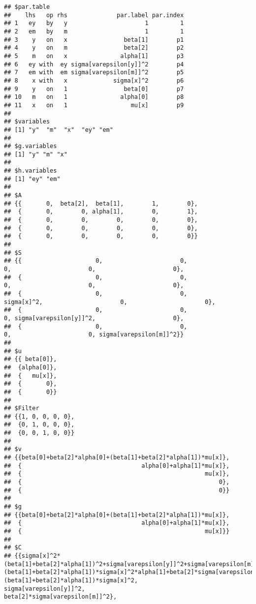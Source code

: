 \documentclass[
]{book}
\theoremstyle{definition}
\theoremstyle{definition}
\theoremstyle{definition}
\theoremstyle{remark}
\begin{document}
\begin{verbatim}
## $par.table
##    lhs   op rhs              par.label par.index
## 1   ey   by   y                      1         1
## 2   em   by   m                      1         1
## 3    y   on   x                beta[1]        p1
## 4    y   on   m                beta[2]        p2
## 5    m   on   x               alpha[1]        p3
## 6   ey with  ey sigma[varepsilon[y]]^2        p4
## 7   em with  em sigma[varepsilon[m]]^2        p5
## 8    x with   x             sigma[x]^2        p6
## 9    y   on   1                beta[0]        p7
## 10   m   on   1               alpha[0]        p8
## 11   x   on   1                  mu[x]        p9
## 
## $variables
## [1] "y"  "m"  "x"  "ey" "em"
## 
## $g.variables
## [1] "y" "m" "x"
## 
## $h.variables
## [1] "ey" "em"
## 
## $A
## {{       0,  beta[2],  beta[1],        1,        0},
##  {       0,        0, alpha[1],        0,        1},
##  {       0,        0,        0,        0,        0},
##  {       0,        0,        0,        0,        0},
##  {       0,        0,        0,        0,        0}} 
## 
## $S
## {{                     0,                      0,                      0,                      0,                      0},
##  {                     0,                      0,                      0,                      0,                      0},
##  {                     0,                      0,             sigma[x]^2,                      0,                      0},
##  {                     0,                      0,                      0, sigma[varepsilon[y]]^2,                      0},
##  {                     0,                      0,                      0,                      0, sigma[varepsilon[m]]^2}} 
## 
## $u
## {{ beta[0]},
##  {alpha[0]},
##  {   mu[x]},
##  {       0},
##  {       0}} 
## 
## $Filter
## {{1, 0, 0, 0, 0},
##  {0, 1, 0, 0, 0},
##  {0, 0, 1, 0, 0}} 
## 
## $v
## {{beta[0]+beta[2]*alpha[0]+(beta[1]+beta[2]*alpha[1])*mu[x]},
##  {                                  alpha[0]+alpha[1]*mu[x]},
##  {                                                    mu[x]},
##  {                                                        0},
##  {                                                        0}} 
## 
## $g
## {{beta[0]+beta[2]*alpha[0]+(beta[1]+beta[2]*alpha[1])*mu[x]},
##  {                                  alpha[0]+alpha[1]*mu[x]},
##  {                                                    mu[x]}} 
## 
## $C
## {{sigma[x]^2*(beta[1]+beta[2]*alpha[1])^2+sigma[varepsilon[y]]^2+sigma[varepsilon[m]]^2*beta[2]^2,                   (beta[1]+beta[2]*alpha[1])*sigma[x]^2*alpha[1]+beta[2]*sigma[varepsilon[m]]^2,                                                           (beta[1]+beta[2]*alpha[1])*sigma[x]^2,                                                                          sigma[varepsilon[y]]^2,                                                                  beta[2]*sigma[varepsilon[m]]^2},

\end{verbatim}
\end{document}
